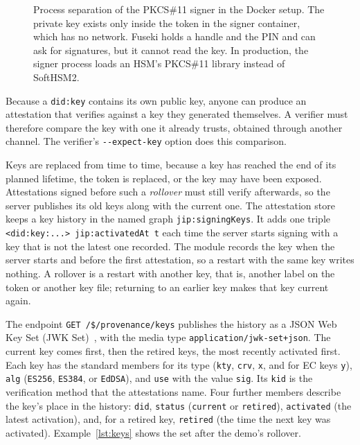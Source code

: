 \documentclass[11pt,a4paper]{article}
\newcommand{\code}[1]{\texttt{#1}}
\begin{document}
\begin{figure}[htb]
\caption{Process separation of the PKCS\#11 signer in the Docker setup. The private key exists
only inside the token in the signer container, which has no network. Fuseki holds a handle and
the PIN and can ask for signatures, but it cannot read the key. In production, the signer
process loads an HSM's PKCS\#11 library instead of SoftHSM2.}
\label{fig:separation}
\end{figure}

Because a \code{did:key} contains its own public key, anyone can produce an attestation that
verifies against a key they generated themselves. A verifier must therefore compare the key with one it
already trusts, obtained through another channel. The verifier's \code{-{}-expect-key} option
does this comparison.

Keys are replaced from time to time, because a key has reached the end of its planned lifetime,
the token is replaced, or the key may have been exposed. Attestations signed before such a
\emph{rollover} must still verify afterwards, so the server publishes its old keys along with
the current one. The attestation store keeps a key history in the named graph
\code{jip:signingKeys}. It adds one triple \code{<did:key:...> jip:activatedAt t} each time the server
starts signing with a key that is not the latest one recorded. The module records the key when
the server starts and before the first attestation, so a restart with the same key writes
nothing. A rollover is a restart with another key, that is, another label on the token or another
key file; returning to an earlier key makes that key current again.

The endpoint \code{GET /\$/provenance/keys} publishes the history as a JSON Web Key Set
(JWK Set)~\cite{jwk}, with the media type \code{application/jwk-set+json}. The current key comes
first, then the retired keys, the most recently activated first. Each key has the standard
members for its type (\code{kty}, \code{crv}, \code{x}, and for EC keys \code{y}), \code{alg}
(\code{ES256}, \code{ES384}, or \code{EdDSA}), and \code{use} with the value \code{sig}. Its
\code{kid} is the verification method that the attestations name. Four further members describe
the key's place in the history: \code{did}, \code{status} (\code{current} or \code{retired}),
\code{activated} (the latest activation), and, for a retired key, \code{retired} (the time the
next key was activated). Example~\ref{lst:keys} shows the set after the demo's rollover.
\end{document}
